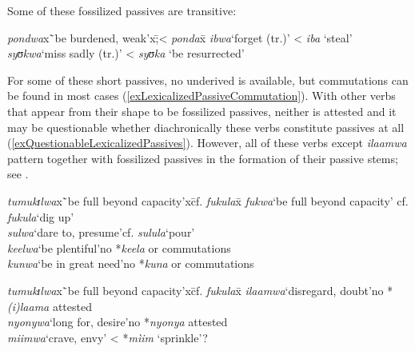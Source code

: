Some of these fossilized passives are transitive:
\begin{exe}
\ex
\begin{tabbing}
\textit{pondwa}x\=`be burdened, weak'x\=;< \textit{ponda}x\=\kill%
\textit{ibwa}\>`forget (tr.)'\> < \textit{iba}\> \lq steal'\\
\textit{syʊkwa}\>`miss sadly (tr.)'\> < \textit{syʊka}\> \lq be resurrected'
\end{tabbing}
\end{exe}

For some of these short passives, no underived  is available, but commutations can be found in most cases (\ref{exLexicalizedPassiveCommutation}). With other verbs that appear from their shape to be fossilized passives, neither is attested and it may be questionable whether diachronically these verbs constitute passives at all (\ref{exQuestionableLexicalizedPassives}). However, all of these verbs except \textit{ilaamwa} pattern together with fossilized passives in the formation of their passive stems; see .
\clearpage

\begin{exe}
\ex \label{exLexicalizedPassiveCommutation}
\begin{tabbing}
\textit{tumukɪlwa}x\=`be full beyond capacity'x\=cf. \textit{fukula}x\=\kill%
\textit{fukwa}\>`be full beyond capacity'\> cf. \textit{fukula}\>`dig up'\\
\textit{sulwa}\>`dare to, presume'\>cf. \textit{sulula}\>`pour'\\
\textit{keelwa}\>`be plentiful'\>no *\textit{keela} or commutations\\%
\textit{kunwa}\>`be in great need'\>no *\textit{kuna} or commutations
\end{tabbing}
\ex \label{exQuestionableLexicalizedPassives}
\begin{tabbing}
\textit{tumukɪlwa}x\=`be full beyond capacity'x\=cf. \textit{fukula}x\=\kill%
\textit{ilaamwa}\>`disregard, doubt'\>no *\textit{(i)laama} attested\\
\textit{nyonywa}\>`long for, desire'\>no *\textit{nyonya} attested\\
\textit{miimwa}\>`crave, envy'\> < *\textit{mìim} `sprinkle'?
\end{tabbing}
\end{exe}

